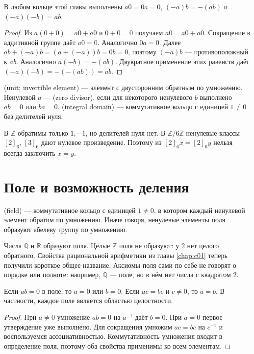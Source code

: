 \begin{theorem}\label{thm:legacy-c22-4}
В любом кольце этой главы выполнены \(a0=0a=0\), \((-a)b=-(ab)\) и \((-a)(-b)=ab\).
\end{theorem}
\begin{proof}
Из \(a(0+0)=a0+a0\) и \(0+0=0\) получаем \(a0=a0+a0\). Сокращение в аддитивной группе даёт \(a0=0\). Аналогично \(0a=0\).
Далее \(ab+(-a)b=(a+(-a))b=0b=0\), поэтому \((-a)b\) — противоположный к \(ab\). Аналогично \(a(-b)=-(ab)\). Двукратное применение этих равенств даёт \((-a)(-b)=-(-(ab))=ab\).
\end{proof}

\begin{definition}
 (unit; invertible element) — элемент с двусторонним обратным по умножению. Ненулевой \(a\) —  (zero divisor), если для некоторого ненулевого \(b\) выполнено \(ab=0\) или \(ba=0\).  (integral domain) — коммутативное кольцо с единицей \(1\ne0\) без делителей нуля.
\end{definition}
В \(\mathbb Z\) обратимы только \(1,-1\), но делителей нуля нет. В \(\mathbb Z/6\mathbb Z\) ненулевые классы \([2]_6\), \([3]_6\) дают нулевое произведение. Поэтому из \([2]_6x=[2]_6y\) нельзя всегда заключить \(x=y\).

\section{Поле и возможность деления}
\begin{definition}
 (field) — коммутативное кольцо с единицей \(1\ne0\), в котором каждый ненулевой элемент обратим по умножению. Иначе говоря, ненулевые элементы поля образуют абелеву группу по умножению.
\end{definition}
Числа \(\mathbb Q\) и \(\mathbb R\) образуют поля. Целые \(\mathbb Z\) поля не образуют: у \(2\) нет целого обратного. Свойства рациональной арифметики из главы \ref{chap:c01} теперь получили короткое общее название. Аксиомы поля сами по себе не говорят о порядке или полноте: например, \(\mathbb Q\) — поле, но в нём нет числа с квадратом \(2\).

\begin{theorem}\label{thm:legacy-c22-5}
Если \(ab=0\) в поле, то \(a=0\) или \(b=0\). Если \(ac=bc\) и \(c\ne0\), то \(a=b\). В частности, каждое поле является областью целостности.
\end{theorem}
\begin{proof}
При \(a\ne0\) умножение \(ab=0\) на \(a^{-1}\) даёт \(b=0\). При \(a=0\) первое утверждение уже выполнено. Для сокращения умножим \(ac=bc\) на \(c^{-1}\) и воспользуемся ассоциативностью. Коммутативность умножения входит в определение поля, поэтому оба свойства применимы ко всем элементам.
\end{proof}


